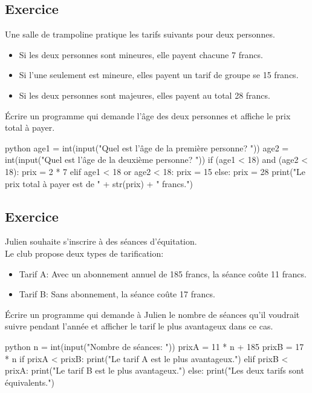 \documentclass[a4paper,11pt]{article}
\begin{document}
\subsection{Exercice}
Une salle de trampoline pratique les tarifs suivants pour deux personnes.\\
\begin{itemize}
    \item Si les deux personnes sont mineures, elle payent chacune 7 francs.
    \item Si l'une seulement est mineure, elles payent un tarif de groupe se 15 francs.
    \item Si les deux personnes sont majeures, elles payent au total 28 francs.
\end{itemize}
Écrire un programme qui demande l'âge des deux personnes et affiche le prix total à payer.
\begin{solution}
\begin{code}[interactive]{python}
age1 = int(input("Quel est l'âge de la première personne? "))
age2 = int(input("Quel est l'âge de la deuxième personne? "))
if (age1 < 18) and (age2 < 18):
    prix = 2 * 7
elif age1 < 18 or age2 < 18:
    prix = 15
else:
    prix = 28
print("Le prix total à payer est de " + str(prix) + " francs.")
\end{code}
\end{solution}

\subsection{Exercice}
Julien souhaite s'inscrire à des séances d'équitation.\\
Le club propose deux types de tarification:
\begin{itemize}
    \item Tarif A: Avec un abonnement annuel de 185 francs, la séance coûte 11 francs.
    \item Tarif B: Sans abonnement, la séance coûte 17 francs.
\end{itemize}
Écrire un programme qui demande à Julien le nombre de séances qu'il voudrait suivre pendant l'année et afficher le tarif le plus avantageux dans ce cas.
\begin{solution}
\begin{code}[interactive]{python}
n = int(input("Nombre de séances: "))
prixA = 11 * n + 185
prixB = 17 * n
if prixA < prixB:
    print("Le tarif A est le plus avantageux.")
elif prixB < prixA:
    print("Le tarif B est le plus avantageux.")
else:
    print("Les deux tarifs sont équivalents.")
\end{code}
\end{solution}
\end{document}
